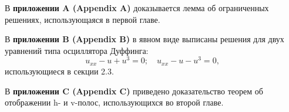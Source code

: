 \documentclass[candidate, href, colorlinks]{disser}
\begin{document}
В \textbf{приложении A (Appendix A)} доказывается лемма об ограниченных решениях, использующаяся в первой главе.

В \textbf{приложении B (Appendix B)} в явном виде выписаны решения для двух уравнений типа осциллятора Дуффинга: 
\begin{equation}
	u_{xx} - u + u^3 = 0; \quad u_{xx} - u - u^3 = 0,
\end{equation}
использующиеся в секции 2.3.

В \textbf{приложении C (Appendix C)} приведено доказательство теорем об отображении h- и v-полос, использующихся во второй главе.


\def\thispagestyle#1{}
\renewcommand{\bibname}{\protect\leftline{\large Список публикаций автора по теме диссертации}}
\printbibliography[keyword=own]


\end{document}
